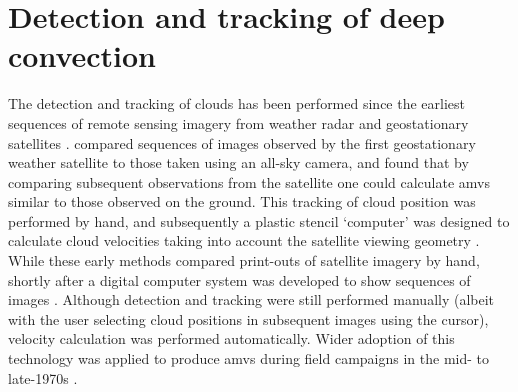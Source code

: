 


\section{Detection and tracking of deep convection} \label{sec:tracking_timeline}

The detection and tracking of clouds has been performed since the earliest sequences of remote sensing imagery from weather radar and geostationary satellites \citep{menzel_cloud_2001}.
\citet{fujita_study_1968} compared sequences of images observed by the first geostationary weather satellite to those taken using an all-sky camera, and found that by comparing subsequent observations from the satellite one could calculate \acrshort{amv}s similar to those observed on the ground.
This tracking of cloud position was performed by hand, and subsequently a plastic stencil `computer' was designed to calculate cloud velocities taking into account the satellite viewing geometry \citep{fujita_present_1969}.
While these early methods compared print-outs of satellite imagery by hand, shortly after a digital computer system was developed to show sequences of images \citep{chang_metracom_1973}.
Although detection and tracking were still performed manually (albeit with the user selecting cloud positions in subsequent images using the cursor), velocity calculation was performed automatically.
Wider adoption of this technology was applied to produce \acrshort{amv}s during field campaigns in the mid- to late-1970s \citep{tecson_cloud-motion_1975}.

